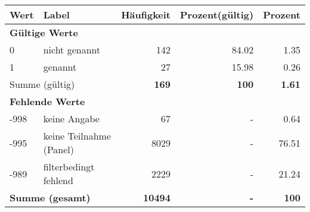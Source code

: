      \begin{longtable}{lXrrr}
     \toprule
     \textbf{Wert} & \textbf{Label} & \textbf{Häufigkeit} & \textbf{Prozent(gültig)} & \textbf{Prozent} \\
     \endhead
     \midrule
     \multicolumn{5}{l}{\textbf{Gültige Werte}}\\

     0 &
     \multicolumn{1}{X}{ nicht genannt   } &


       \num{142} &
       \num[round-mode=places,round-precision=2]{84.02} &
         \num[round-mode=places,round-precision=2]{1.35} \\

     1 &
     \multicolumn{1}{X}{ genannt   } &


       \num{27} &
       \num[round-mode=places,round-precision=2]{15.98} &
         \num[round-mode=places,round-precision=2]{0.26} \\
     \midrule
     \multicolumn{2}{l}{Summe (gültig)} &
       \textbf{\num{169}} &
     \textbf{\num{100}} &
       \textbf{\num[round-mode=places,round-precision=2]{1.61}} \\
     \multicolumn{5}{l}{\textbf{Fehlende Werte}}\\
       -998 &
       keine Angabe &
         \num{67} &
        - &
         \num[round-mode=places,round-precision=2]{0.64} \\
       -995 &
       keine Teilnahme (Panel) &
         \num{8029} &
        - &
         \num[round-mode=places,round-precision=2]{76.51} \\
       -989 &
       filterbedingt fehlend &
         \num{2229} &
        - &
         \num[round-mode=places,round-precision=2]{21.24} \\
     \midrule
     \multicolumn{2}{l}{\textbf{Summe (gesamt)}} &
          \textbf{\num{10494}} &
        \textbf{-} &
        \textbf{\num{100}} \\
     \bottomrule
     \end{longtable}
     
